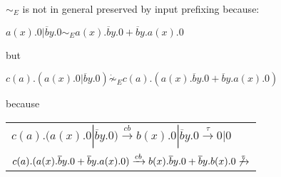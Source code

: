 \begin{example}
  $\sim_{E}$ is not in general preserved by input prefixing because:
    \begin{center}
      $a(x).0 | \overline{b}y.0 \sim_{E} a(x).\overline{b}y.0 + \overline{b}y.a(x).0$
    \end{center}
    but 
    \begin{center}
      $c(a).(a(x).0 | \overline{b}y.0) \dot{\not\sim}_{E} c(a).(a(x).\overline{b}y.0 + \overline{b}y.a(x).0)$
    \end{center}
    because
    \begin{center}
      \begin{tabular}{l}
	  $c(a).(a(x).0 | \overline{b}y.0) \xrightarrow{cb} b(x).0 | \overline{b}y.0 \xrightarrow{\tau} 0|0$
	\\
	  $c(a).(a(x).\overline{b}y.0 + \overline{b}y.a(x).0) \xrightarrow{cb} b(x).\overline{b}y.0 + \overline{b}y.b(x).0 \not\xrightarrow{\tau}$
      \end{tabular}
    \end{center}
\end{example}

